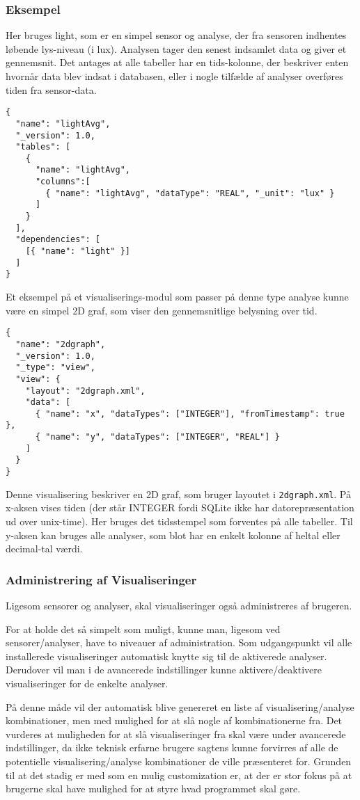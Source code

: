 \subsubsection{Eksempel}
Her bruges light, som er en simpel sensor og analyse, der fra sensoren indhentes løbende lys-niveau (i lux).
Analysen tager den senest indsamlet data og giver et gennemsnit.
Det antages at alle tabeller har en tids-kolonne, der beskriver enten hvornår data blev indsat i databasen, eller i nogle tilfælde af analyser overføres tiden fra sensor-data.

\begin{lstlisting}
{
  "name": "lightAvg",
  "_version": 1.0,
  "tables": [
    {
      "name": "lightAvg",
      "columns":[
        { "name": "lightAvg", "dataType": "REAL", "_unit": "lux" }
      ]
    }
  ],
  "dependencies": [
    [{ "name": "light" }]
  ]
}
\end{lstlisting}

Et eksempel på et visualiserings-modul som passer på denne type analyse kunne være en simpel 2D graf, som viser den gennemsnitlige belysning over tid.

\begin{lstlisting}
{
  "name": "2dgraph",
  "_version": 1.0,
  "_type": "view",
  "view": {
    "layout": "2dgraph.xml",
    "data": [
      { "name": "x", "dataTypes": ["INTEGER"], "fromTimestamp": true },
      { "name": "y", "dataTypes": ["INTEGER", "REAL"] }
    ]
  }
}
\end{lstlisting}
 
Denne visualisering beskriver en 2D graf, som bruger layoutet i \texttt{2dgraph.xml}.
På x-aksen vises tiden (der står INTEGER fordi SQLite ikke har datorepræsentation ud over unix-time).
Her bruges det tidsstempel som forventes på alle tabeller.
Til y-aksen kan bruges alle analyser, som blot har en enkelt kolonne af heltal eller decimal-tal værdi.

\subsubsection{Administrering af Visualiseringer}
Ligesom sensorer og analyser, skal visualiseringer også administreres af brugeren.

For at holde det så simpelt som muligt, kunne man, ligesom ved sensorer/analyser, have to niveauer af administration.
Som udgangspunkt vil alle installerede visualiseringer automatisk knytte sig til de aktiverede analyser.
Derudover vil man i de avancerede indstillinger kunne aktivere/deaktivere visualiseringer for de enkelte analyser.

På denne måde vil der automatisk blive genereret en liste af visualisering/analyse kombinationer, men med mulighed for at slå nogle af kombinationerne fra.
Det vurderes at muligheden for at slå visualiseringer fra skal være under avancerede indstillinger, da ikke teknisk erfarne brugere sagtens kunne forvirres af alle de potentielle visualisering/analyse kombinationer de ville præsenteret for.
Grunden til at det stadig er med som en mulig customization er, at der er stor fokus på at brugerne skal have mulighed for at styre hvad programmet skal gøre. 
